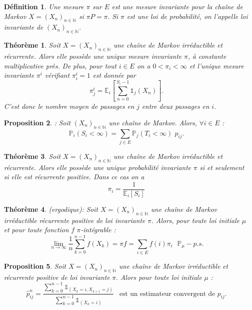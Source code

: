 \documentclass[12pt,a4paper]{report}
\newtheorem{thm}{Théorème}[section]
\newtheorem{definition}{Définition}[section]
\newtheorem{prop}[thm]{Proposition}
\theoremstyle{remark}
\begin{document}
\begin{definition}\label{def3}
Une mesure $\pi$ sur $E$ est une mesure invariante pour la chaîne de Markov
$X=(X_n)_{n \in \mathbb{N}}$ si $\pi P = \pi$. Si $\pi$ est une loi de probabilité, on l'appelle loi invariante de $(X_n)_{n \in \mathbb{N}}$.
\end{definition}
\begin{thm}\label{th6}
Soit $X=(X_n)_{n\in\mathbb{N}}$ une chaîne de Markov irréductible et récurrente. Alors elle possède une unique mesure invariante $\pi$, à constante multiplicative près. De plus, pour tout $i\in E$ on a $0<\pi_i<\infty$ et l'unique mesure invariante $\pi^i$ vérifiant $\pi_i^i=1$ est donnée par $$\pi_j^i = \mathbb{E}_i\left[\sum_{n=0}^{S_i-1}\mathds{1}_j(X_n) \right].$$
C'est donc le nombre moyen de passages en $j$ entre deux passages en $i$.
\end{thm}
\begin{prop}\label{prop1}
: Soit $(X_n)_{n \in \mathbb{N}}$ une chaîne de Markov. Alors, $\forall i \in E$ :
$$\mathbb{P}_i(S_i <\infty) = \sum\limits_{j \in E} \mathbb{P}_j(T_i < \infty) \, \, p_{ij}.$$
\end{prop}
\begin{thm}\label{th61}
Soit $X=\left(X_{n}\right)_{n \in \mathbb{N}}$ une chaîne de Markov irréductible et récurrente. Alors elle possède une unique probabilité invariante $\pi$ si et seulement si elle est récurrente positive. Dans ce cas on a
$$
\pi_{i}=\frac{1}{\mathbb{E}_{i}\left[S_{i}\right]}
$$
\end{thm}

\begin{thm}\label{th4}
(ergodique): Soit $X = (X_n)_{n \in \mathbb{N}}$ une chaîne de Markov irréductible récurrente positive de loi invariante $\pi$. Alors, pour toute loi initiale $\mu$ et pour toute fonction $f \, \, \pi$-intégrable :\\
$$\lim\limits_{n \rightarrow \infty}  \frac{1}{n} \sum\limits_{k=0}^{n-1} f\left(X_{k}\right) = \pi f=\sum\limits_{i \in E} f(i) \pi_{i} \, \, \, \, \mathbb{P}_{\mu}-p.s.$$
\end{thm}
\begin{prop}\label{prop0}
Soit $X=\left(X_{n}\right)_{n \in \mathbb{N}}$ une chaîne de Markov irréductible et récurrente positive de loi invariante $\pi .$ Alors pour toute loi initiale $\mu$ :
$$
\widehat{p}_{i j}^{n}=\frac{\sum_{k=0}^{n-1} \mathds{1}_{\left(X_{k}=i, X_{k+1}=j\right)}}{\sum_{k=0}^{n-1} \mathds{1}_{\left(X_{k}=i\right)}}
\, \, \, \text{ est un estimateur convergent de } p_{i j}.$$
\end{prop}
\end{document}
